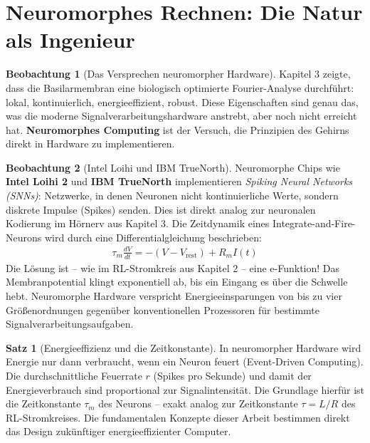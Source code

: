 ﻿\documentclass[a4paper,12pt]{report}
\theoremstyle{definition}
\newtheorem{satz}{Satz}
\newtheorem{beobachtung}{Beobachtung}
\begin{document}
	\section{Neuromorphes Rechnen: Die Natur als Ingenieur}
	
	\begin{beobachtung}[Das Versprechen neuromorpher Hardware]
		Kapitel 3 zeigte, dass die Basilarmembran eine biologisch optimierte Fourier-Analyse durchführt: lokal, kontinuierlich, energieeffizient, robust. Diese Eigenschaften sind genau das, was die moderne Signalverarbeitungshardware anstrebt, aber noch nicht erreicht hat. \textbf{Neuromorphes Computing} ist der Versuch, die Prinzipien des Gehirns direkt in Hardware zu implementieren.
	\end{beobachtung}
	
	\begin{beobachtung}[Intel Loihi und IBM TrueNorth]
		Neuromorphe Chips wie \textbf{Intel Loihi 2} und \textbf{IBM TrueNorth} implementieren \emph{Spiking Neural Networks (SNNs)}: Netzwerke, in denen Neuronen nicht kontinuierliche Werte, sondern diskrete Impulse (Spikes) senden. Dies ist direkt analog zur neuronalen Kodierung im Hörnerv aus Kapitel 3. Die Zeitdynamik eines Integrate-and-Fire-Neurons wird durch eine Differentialgleichung beschrieben:
		\begin{align}
			\tau_m \frac{dV}{dt} = -(V - V_{\text{rest}}) + R_m I(t)
		\end{align}
		Die Lösung ist -- wie im RL-Stromkreis aus Kapitel 2 -- eine e-Funktion! Das Membranpotential klingt exponentiell ab, bis ein Eingang es über die Schwelle hebt. Neuromorphe Hardware verspricht Energieeinsparungen von bis zu vier Größenordnungen gegenüber konventionellen Prozessoren für bestimmte Signalverarbeitungsaufgaben.
	\end{beobachtung}
	
	\begin{satz}[Energieeffizienz und die Zeitkonstante]
		In neuromorpher Hardware wird Energie nur dann verbraucht, wenn ein Neuron feuert (Event-Driven Computing). Die durchschnittliche Feuerrate $r$ (Spikes pro Sekunde) und damit der Energieverbrauch sind proportional zur Signalintensität. Die Grundlage hierfür ist die Zeitkonstante $\tau_m$ des Neurons -- exakt analog zur Zeitkonstante $\tau = L/R$ des RL-Stromkreises. Die fundamentalen Konzepte dieser Arbeit bestimmen direkt das Design zukünftiger energieeffizienter Computer.
	\end{satz}
	
\end{document}
